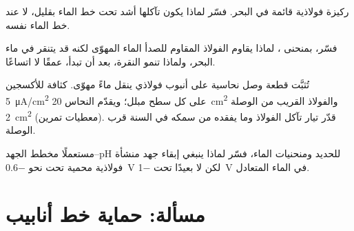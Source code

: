 \begin{exercise}[$\star\star$]\label{exo:b2:corrosion:9}
ركيزة فولاذية قائمة في البحر. فسّر لماذا يكون تآكلها أشد تحت
خط الماء بقليل، لا عند خط الماء نفسه.
\end{exercise}

\begin{exercise}[$\star\star\star$]\label{exo:b2:corrosion:10}
فسّر، بمنحنى ، لماذا يقاوم الفولاذ المقاوم للصدأ الماء المهوّى لكنه
قد يتنقر في ماء البحر، ولماذا تنمو النقرة، بعد أن تبدأ، عمقًا لا
اتساعًا.
\end{exercise}

\begin{exercise}[$\star\star\star$]\label{exo:b2:corrosion:11}
تُثبَّت قطعة وصل نحاسية على أنبوب فولاذي ينقل ماءً مهوّى. كثافة
 للأكسجين \qty{5}{\micro A/cm^2} على كل سطح مبلل؛ ويقدّم
النحاس \qty{20}{cm^2} والفولاذ القريب من الوصلة \qty{2}{cm^2}
(معطيات تمرين). قدّر تيار تآكل الفولاذ وما يفقده من
سمكه في السنة قرب الوصلة.
\end{exercise}

\begin{exercise}[$\star\star\star$]\label{exo:b2:corrosion:12}
مستعملًا مخطط الجهد--pH للحديد ومنحنيات الماء، فسّر لماذا ينبغي إبقاء
جهد منشأة فولاذية محمية تحت نحو
\qty{-0.6}{V} لكن لا بعيدًا تحت \qty{-1}{V} في الماء المتعادل.
\end{exercise}

\section{مسألة: حماية خط أنابيب}

